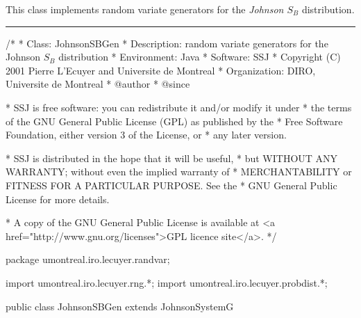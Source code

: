 
This class implements random variate generators for the
{\em Johnson $S_B$\/} distribution.

\bigskip\hrule

\begin{code}
\begin{hide}
/*
 * Class:        JohnsonSBGen
 * Description:  random variate generators for the Johnson $S_B$ distribution
 * Environment:  Java
 * Software:     SSJ
 * Copyright (C) 2001  Pierre L'Ecuyer and Universite de Montreal
 * Organization: DIRO, Universite de Montreal
 * @author
 * @since

 * SSJ is free software: you can redistribute it and/or modify it under
 * the terms of the GNU General Public License (GPL) as published by the
 * Free Software Foundation, either version 3 of the License, or
 * any later version.

 * SSJ is distributed in the hope that it will be useful,
 * but WITHOUT ANY WARRANTY; without even the implied warranty of
 * MERCHANTABILITY or FITNESS FOR A PARTICULAR PURPOSE.  See the
 * GNU General Public License for more details.

 * A copy of the GNU General Public License is available at
   <a href="http://www.gnu.org/licenses">GPL licence site</a>.
 */
\end{hide}
package umontreal.iro.lecuyer.randvar;\begin{hide}
import umontreal.iro.lecuyer.rng.*;
import umontreal.iro.lecuyer.probdist.*;
\end{hide}


public class JohnsonSBGen extends JohnsonSystemG \begin{hide} {
\end{hide}\end{code}

